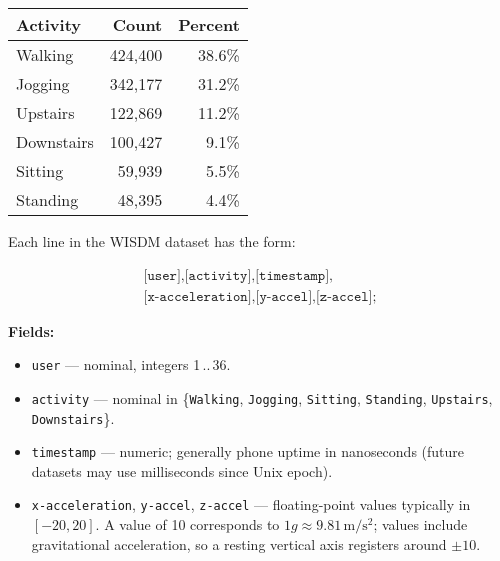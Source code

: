 \documentclass[10pt,twocolumn]{article}
\begin{document}
\begin{table}[H]
\centering
\small
\begin{tabular}{lrr}
\toprule
\textbf{Activity} & \textbf{Count} & \textbf{Percent} \\
\midrule
Walking   & 424{,}400 & 38.6\% \\
Jogging   & 342{,}177 & 31.2\% \\
Upstairs  & 122{,}869 & 11.2\% \\
Downstairs& 100{,}427 & 9.1\% \\
Sitting   & 59{,}939  & 5.5\% \\
Standing  & 48{,}395  & 4.4\% \\
\bottomrule
\end{tabular}
\end{table}




Each line in the WISDM dataset has the form:

\begin{multline*}
\texttt{[user],[activity],[timestamp],} \\
\texttt{[x-acceleration],[y-accel],[z-accel];}
\end{multline*}

\noindent \textbf{Fields:}
\begin{itemize}[leftmargin=1.1em]
  \item \texttt{user} --- nominal, integers 1\,..\,36.
  \item \texttt{activity} --- nominal in \{\texttt{Walking}, \texttt{Jogging}, \texttt{Sitting}, \texttt{Standing}, \texttt{Upstairs}, \texttt{Downstairs}\}.
  \item \texttt{timestamp} --- numeric; generally phone uptime in nanoseconds (future datasets may use milliseconds since Unix epoch).
  \item \texttt{x-acceleration}, \texttt{y-accel}, \texttt{z-accel} --- floating-point values typically in \([-20,20]\). A value of 10 corresponds to \(1g \approx 9.81\,\mathrm{m/s^2}\); values include gravitational acceleration, so a resting vertical axis registers around \(\pm 10\).
\end{itemize}
\end{document}
